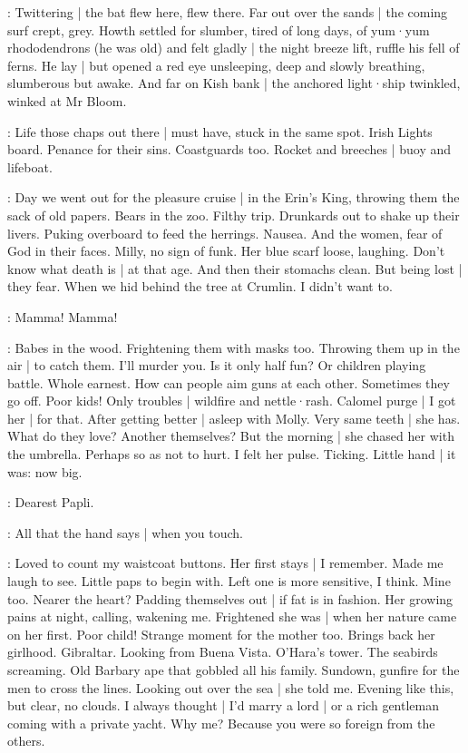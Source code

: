 :
Twittering |
the bat flew here,
flew there.
Far out over the sands |
the coming surf crept,
grey.
Howth settled for slumber,
tired of long days,
of yum·yum rhododendrons
(he was old)
and felt gladly |
the night breeze lift,
ruffle his fell of ferns.
He lay |
but opened a red eye
unsleeping,
deep and slowly breathing,
slumberous but awake.%
And far on Kish bank |
the anchored light·ship twinkled,
winked at Mr Bloom.

\BloomAbstract:
Life those chaps out there |
must have,
stuck in the same spot.
Irish Lights board.
Penance for their sins.
Coastguards too.
Rocket and breeches |
buoy and lifeboat.

\BloomHist:
Day we went out for the pleasure cruise |
in the Erin's King,
throwing them the sack of old papers.
Bears in the zoo.
Filthy trip.
Drunkards out to shake up their livers.
Puking overboard to feed the herrings.
Nausea.
And the women,
fear of God in their faces.
Milly,
no sign of funk.
Her blue scarf loose,
laughing.
Don't know what death is |
at that age.
And then their stomachs clean.
But being lost |
they fear.
When we hid behind the tree at Crumlin.%
I didn't want to.

\BloomOther:
Mamma!
Mamma!

\BloomHist:
Babes in the wood.
Frightening them with masks too.
Throwing them up in the air |
to catch them.
I'll murder you.
Is it only half fun?
Or children playing battle.
Whole earnest.
How can people aim guns at each other.
Sometimes they go off.
Poor kids!
Only troubles |
wildfire and nettle·rash.
Calomel purge |
I got her |
for that.
After getting better |
asleep with Molly.
Very same teeth |
she has.
What do they love?
Another themselves?
But the morning |
she chased her with the umbrella.
Perhaps so as not to hurt.
I felt her pulse.
Ticking.
Little hand |
it was:
now big.

\BloomToday:
Dearest Papli.

\BloomAbstract:
All that the hand says |
when you touch.

\BloomHist:
Loved to count my waistcoat buttons.
Her first stays |
I remember.
Made me laugh to see.
Little paps to begin with.%
Left one is more sensitive,
I think.
Mine too.
Nearer the heart?
Padding themselves out |
if fat is in fashion.
Her growing pains at night,
calling,
wakening me.
Frightened she was |
when her nature came on her first.
Poor child!
Strange moment for the mother too.
Brings back her girlhood.
Gibraltar.
Looking from Buena Vista.
O'Hara's tower.
The seabirds screaming.
Old Barbary ape that gobbled all his family.
Sundown,
gunfire for the men to cross the lines.
Looking out over the sea |
she told me.
Evening like this,
but clear,
no clouds.
I always thought |
I'd marry a lord |
or a rich gentleman coming with a private yacht.
Why me?
Because you were so foreign
from the others.

